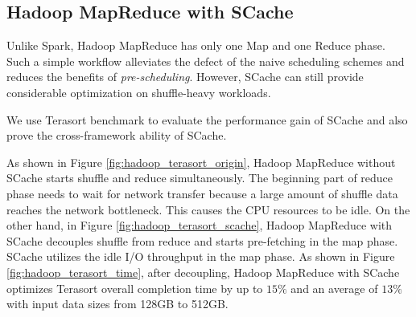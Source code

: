 \subsection{Hadoop MapReduce with SCache}

Unlike Spark, Hadoop MapReduce has only one Map and one Reduce phase.
Such a simple workflow alleviates the defect of the naive scheduling schemes and reduces the benefits of \textit{pre-scheduling}.
However, SCache can still provide considerable optimization on shuffle-heavy workloads.

We use Terasort  benchmark to evaluate the performance gain of SCache and also prove the cross-framework ability of SCache.

As shown in Figure \ref{fig:hadoop_terasort_origin}, Hadoop MapReduce without SCache starts shuffle and reduce simultaneously.
The beginning part of reduce phase needs to wait for network transfer because a large amount of shuffle data reaches the network bottleneck.
This causes the CPU resources to be idle. 
On the other hand, in Figure \ref{fig:hadoop_terasort_scache}, Hadoop MapReduce with SCache decouples shuffle from reduce and starts pre-fetching in the map phase.
SCache utilizes the idle I/O throughput in the map phase.
As shown in Figure \ref{fig:hadoop_terasort_time}, after decoupling, Hadoop MapReduce with SCache optimizes Terasort overall completion time by up to $15\%$ and an average of $13\%$ with input data sizes from 128GB to 512GB.

